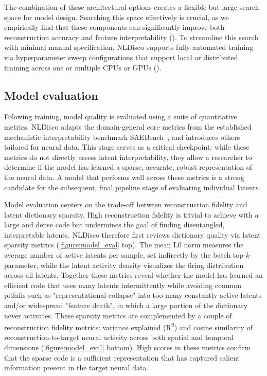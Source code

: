 The combination of these architectural options creates a flexible but large search space for model design. Searching this space effectively is crucial, as we empirically find that these components can significantly improve both reconstruction accuracy and feature interpretability (). To streamline this search with minimal manual specification, NLDisco supports fully automated training via hyperparameter sweep configurations that support local or distributed training across one or multiple CPUs or GPUs ().

\subsection{Model evaluation}

Folowing training, model quality is evaluated using a suite of quantitative metrics. NLDisco adapts the domain-general core metrics from the established mechanistic interpretability benchmark SAEBench~\cite{karvonen_2025_saebench}, and introduces others tailored for neural data. This stage serves as a critical checkpoint: while these metrics do not directly assess latent interpretability, they allow a researcher to determine if the model has learned a sparse, accurate, robust representation of the neural data. A model that performs well across these metrics is a strong candidate for the subsequent, final pipeline stage of evaluating individual latents.

Model evaluation centers on the trade-off between reconstruction fidelity and latent dictionary sparsity. High reconstruction fidelity is trivial to achieve with a large and dense code but undermines the goal of finding disentangled, interpretable latents. NLDisco therefore first reviews dictionary quality via latent sparsity metrics (\autoref{figure:model_eval} top). The mean L0 norm measures the average number of active latents per sample, set indirectly by the batch top-$k$ parameter, while the latent activity density visualizes the firing distribution across all latents. Together these metrics reveal whether the model has learned an efficient code that uses many latents intermittently while avoiding common pitfalls such as "representational collapse" into too many constantly active latents and/or widespread "feature death", in which a large portion of the dictionary never activates. These sparsity metrics are complemented by a couple of reconstruction fidelity metrics: variance explained (R\textsuperscript{2}) and cosine similarity of reconstruction-to-target neural activity across both spatial and temporal dimensions (\autoref{figure:model_eval} bottom). High scores in these metrics confirm that the sparse code is a sufficient representation that has captured salient information present in the target neural data.


